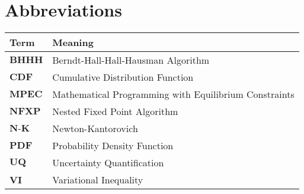 

\section*{Abbreviations} %
\thispagestyle{plain} %

\phantom{This text will be invisible}
\hspace{20cm}



\begin{table}[H]
	\centering
	\renewcommand{\arraystretch}{1.2}%
	\begin{tabular}{@{}ll@{}}
		\toprule\midrule
	Term\phantom{space}	& Meaning \\ \midrule
		$\textbf{BHHH}$	& Berndt-Hall-Hall-Hausman Algorithm \\
		$\textbf{CDF}$  & Cumulative Distribution Function \\
		$\textbf{MPEC}$	& Mathematical Programming with Equilibrium Constraints \\
		$\textbf{NFXP}$	& Nested Fixed Point Algorithm \\
		$\textbf{N-K}$	& Newton-Kantorovich \\
		$\textbf{PDF}$  & Probability Density Function \\
		$\textbf{UQ}$   & Uncertainty Quantification \\
		$\textbf{VI}$	& Variational Inequality \\
 \bottomrule
	\end{tabular}
\end{table}